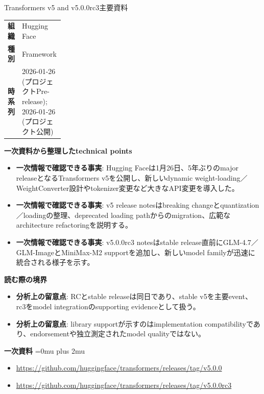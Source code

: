 \begin{technicalnote}{Transformers v5 and v5.0.0rc3}{主要資料}
\begingroup
\begin{tabularx}{\linewidth}{@{}>{\bfseries}p{0.22\linewidth}X@{}}
組織 & Hugging Face \\
種別 & Framework \\
時系列 & 2026-01-26 (プロジェクトPre-release); 2026-01-26 (プロジェクト公開) \\
\end{tabularx}
\smallskip
{\bfseries 一次資料から整理したtechnical points}
\begin{itemize}[leftmargin=1.5em,itemsep=0.35em]
\item \textbf{一次情報で確認できる事実}: Hugging Faceは1月26日、5年ぶりのmajor releaseとなるTransformers v5を公開し、新しいdynamic weight-loading／WeightConverter設計やtokenizer変更など大きなAPI変更を導入した。
\item \textbf{一次情報で確認できる事実}: v5 release notesはbreaking changeとquantization／loadingの整理、deprecated loading pathからのmigration、広範なarchitecture refactoringを説明する。
\item \textbf{一次情報で確認できる事実}: v5.0.0rc3 notesはstable release直前にGLM-4.7／GLM-ImageとMiniMax-M2 supportを追加し、新しいmodel familyが迅速に統合される様子を示す。
\end{itemize}
\begin{minipage}{\linewidth}
{\bfseries 読む際の境界}
\begin{itemize}[leftmargin=1.5em,itemsep=0.35em]
\item \textbf{分析上の留意点}: RCとstable releaseは同日であり、stable v5を主要event、rc3をmodel integrationのsupporting evidenceとして扱う。
\item \textbf{分析上の留意点}: library supportが示すのはimplementation compatibilityであり、endorsementや独立測定されたmodel qualityではない。
\end{itemize}
\begin{samepage}
{\bfseries 一次資料}
\begingroup\sloppy
\Urlmuskip=0mu plus 2mu\relax
\begin{itemize}[leftmargin=1.5em,itemsep=0.25em]
\item {\scriptsize\url{https://github.com/huggingface/transformers/releases/tag/v5.0.0}}
\item {\scriptsize\url{https://github.com/huggingface/transformers/releases/tag/v5.0.0rc3}}
\end{itemize}
\endgroup
\end{samepage}
\end{minipage}
\endgroup
\end{technicalnote}
\medskip

